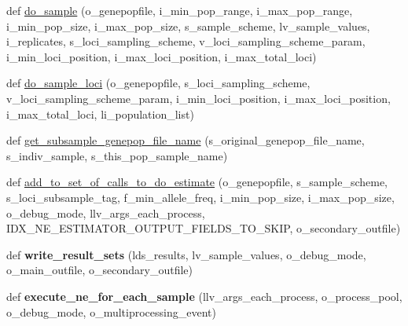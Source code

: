 \begin{DoxyCompactItemize}
\item 
def \hyperlink{namespacenegui_1_1pgdriveneestimator_a8b8feb1e5b7dcf5e546b4bbdcebb59a8}{do\+\_\+sample} (o\+\_\+genepopfile, i\+\_\+min\+\_\+pop\+\_\+range, i\+\_\+max\+\_\+pop\+\_\+range, i\+\_\+min\+\_\+pop\+\_\+size, i\+\_\+max\+\_\+pop\+\_\+size, s\+\_\+sample\+\_\+scheme, lv\+\_\+sample\+\_\+values, i\+\_\+replicates, s\+\_\+loci\+\_\+sampling\+\_\+scheme, v\+\_\+loci\+\_\+sampling\+\_\+scheme\+\_\+param, i\+\_\+min\+\_\+loci\+\_\+position, i\+\_\+max\+\_\+loci\+\_\+position, i\+\_\+max\+\_\+total\+\_\+loci)
\item 
def \hyperlink{namespacenegui_1_1pgdriveneestimator_afe018505bc1f9a64aa804139954ae5f1}{do\+\_\+sample\+\_\+loci} (o\+\_\+genepopfile, s\+\_\+loci\+\_\+sampling\+\_\+scheme, v\+\_\+loci\+\_\+sampling\+\_\+scheme\+\_\+param, i\+\_\+min\+\_\+loci\+\_\+position, i\+\_\+max\+\_\+loci\+\_\+position, i\+\_\+max\+\_\+total\+\_\+loci, li\+\_\+population\+\_\+list)
\item 
def \hyperlink{namespacenegui_1_1pgdriveneestimator_a84955fc339f0354149185b5fa6444340}{get\+\_\+subsample\+\_\+genepop\+\_\+file\+\_\+name} (s\+\_\+original\+\_\+genepop\+\_\+file\+\_\+name, s\+\_\+indiv\+\_\+sample, s\+\_\+this\+\_\+pop\+\_\+sample\+\_\+name)
\item 
def \hyperlink{namespacenegui_1_1pgdriveneestimator_ab0bca56261e2d7951b4c7a65897ee053}{add\+\_\+to\+\_\+set\+\_\+of\+\_\+calls\+\_\+to\+\_\+do\+\_\+estimate} (o\+\_\+genepopfile, s\+\_\+sample\+\_\+scheme, s\+\_\+loci\+\_\+subsample\+\_\+tag, f\+\_\+min\+\_\+allele\+\_\+freq, i\+\_\+min\+\_\+pop\+\_\+size, i\+\_\+max\+\_\+pop\+\_\+size, o\+\_\+debug\+\_\+mode, llv\+\_\+args\+\_\+each\+\_\+process, I\+D\+X\+\_\+\+N\+E\+\_\+\+E\+S\+T\+I\+M\+A\+T\+O\+R\+\_\+\+O\+U\+T\+P\+U\+T\+\_\+\+F\+I\+E\+L\+D\+S\+\_\+\+T\+O\+\_\+\+S\+K\+IP, o\+\_\+secondary\+\_\+outfile)
\item 
def {\bfseries write\+\_\+result\+\_\+sets} (lds\+\_\+results, lv\+\_\+sample\+\_\+values, o\+\_\+debug\+\_\+mode, o\+\_\+main\+\_\+outfile, o\+\_\+secondary\+\_\+outfile)\hypertarget{namespacenegui_1_1pgdriveneestimator_aa45ae8154c350b0a30ba8c1037bfd445}{}\label{namespacenegui_1_1pgdriveneestimator_aa45ae8154c350b0a30ba8c1037bfd445}

\item 
def {\bfseries execute\+\_\+ne\+\_\+for\+\_\+each\+\_\+sample} (llv\+\_\+args\+\_\+each\+\_\+process, o\+\_\+process\+\_\+pool, o\+\_\+debug\+\_\+mode, o\+\_\+multiprocessing\+\_\+event)\hypertarget{namespacenegui_1_1pgdriveneestimator_aefaaafaa951edf46424dfc57535046a7}{}\label{namespacenegui_1_1pgdriveneestimator_aefaaafaa951edf46424dfc57535046a7}


\end{DoxyCompactItemize}

